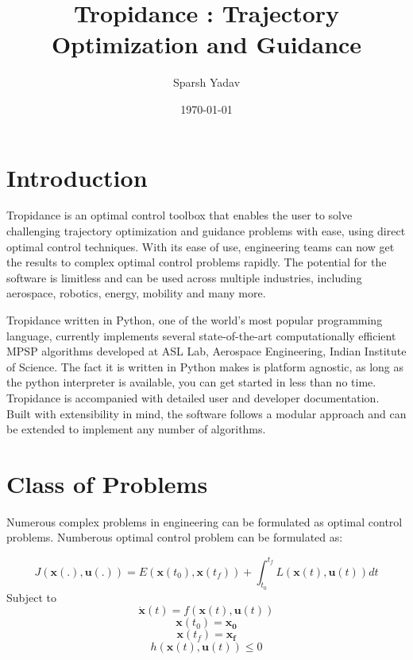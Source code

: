 \documentclass[12pt]{article}
\title{Tropidance : Trajectory Optimization and Guidance}
\author{Sparsh Yadav}
\date{\today}
\begin{document}
\maketitle{}

\tableofcontents

\clearpage
\newpage

\section{Introduction}

Tropidance is an optimal control toolbox that enables the user to solve challenging trajectory optimization and guidance problems with ease, using direct optimal control techniques. With its ease of use, engineering teams can now get the results to complex optimal control problems rapidly. The potential for the software is limitless and can be used across multiple industries, including aerospace, robotics, energy, mobility and many more. 

Tropidance written in Python, one of the world's most popular programming language, currently implements several state-of-the-art computationally efficient MPSP algorithms developed at ASL Lab, Aerospace Engineering, Indian Institute of Science. The fact it is written in Python makes is platform agnostic, as long as the python interpreter is available, you can get started in less than no time. Tropidance is accompanied with detailed user and developer documentation. Built with extensibility in mind, the software follows a modular approach and can be extended to implement any number of algorithms.

\section{Class of Problems}

Numerous complex problems in engineering can be formulated as optimal control problems. Numberous optimal control problem can be formulated as:

\begin{equation}
J(\mathbf{x}(.), \mathbf{u}(.))=E\left(\mathbf{x}\left(t_{0}\right), \mathbf{x}\left(t_{f}\right)\right)+\int_{t_{0}}^{t_{f}} L(\mathbf{x}(t), \mathbf{u}(t)) d t
\end{equation}
Subject to 
\begin{equation}
\dot{\mathbf{x}}(t)=f(\mathbf{x}(t), \mathbf{u}(t))
\end{equation}
\begin{equation}
\mathbf{x}\left(t_{0}\right)= \mathbf{x_0} 
\end{equation}
\begin{equation}
\mathbf{x}\left(t_{f}\right)= \mathbf{x_f} 
\end{equation}
\begin{equation}
h(\mathbf{x}(t), \mathbf{u}(t)) \leq 0
\end{equation}
\end{document}
